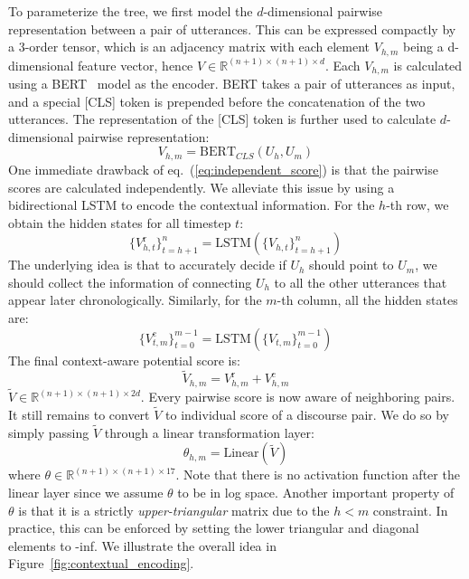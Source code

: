 \documentclass[11pt]{article}
\begin{document}
To parameterize the tree, we first model the $d$-dimensional pairwise representation between a pair of utterances. This can be expressed compactly by a 3-order tensor,
which is an adjacency matrix with each element $V_{h,m}$ being a d-dimensional feature vector, hence
$V\in \mathbb{R}^{(n+1)\times (n+1)\times d}$.
Each $V_{h,m}$ is calculated using a BERT~\cite{devlin2018bert} model as the encoder. 
BERT takes a pair of utterances as input, and a special [CLS] token is prepended before the concatenation of the two utterances. The representation of the [CLS] token is further used to calculate $d$-dimensional pairwise representation:
\begin{equation}
    V_{h,m} = \mathrm{BERT}_{CLS}(U_h,U_m)
    \label{eq:independent_score}
\end{equation}
One immediate drawback of eq.~(\ref{eq:independent_score}) is that the pairwise scores are calculated independently. We alleviate this issue by using a bidirectional LSTM to encode the contextual information.
For the $h$-th row, we obtain the hidden states for all timestep $t$:
\begin{equation}
    \{V_{h,t}^\mathrm{r}\}_{t=h+1}^n = \mathrm{LSTM}(\{V_{h,t}\}_{t=h+1}^n)
\end{equation}
The underlying idea is that to accurately decide if $U_h$ should point to $U_m$, we should collect the information of connecting $U_h$ to all the other utterances that appear later chronologically.
Similarly, for the $m$-th column, all the hidden states are:
\begin{equation}
    \{V_{t,m}^\mathrm{c}\}_{t=0}^{m-1} = \mathrm{LSTM}(\{V_{t,m}\}_{t=0}^{m-1})
\end{equation}
The final context-aware potential score is:
\begin{equation}
    \tilde V_{h,m} = V^\mathrm{r}_{h,m}+V^\mathrm{c}_{h,m}
    \label{eq:encoder}
\end{equation}
$\tilde V\in \mathbb{R}^{(n+1)\times (n+1)\times 2d}$.
Every pairwise score is now aware of neighboring pairs.
It still remains to convert $\tilde V$ to individual score of a discourse pair. We do so by simply passing $\tilde V$ through a linear transformation layer:
\begin{equation}
    \theta_{h,m} = \mathrm{Linear}(\tilde V)
    \label{eq:encoder}
\end{equation}where
$\theta\in \mathbb{R}^{(n+1)\times (n+1)\times 17}$.
Note that there is no activation function after the linear layer since we assume $\theta$ to be in log space. Another important property of $\theta$ is that it is a strictly \emph{upper-triangular} matrix due to the $h<m$ constraint. In practice, this can be enforced by setting the lower triangular and diagonal elements to -inf. We illustrate the overall idea in Figure~\ref{fig:contextual_encoding}.
\end{document}
